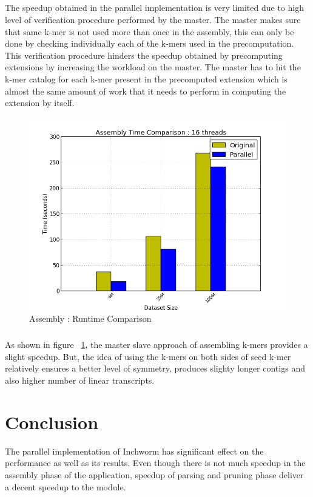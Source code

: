 \label{key}\documentclass[bachinf, english ,zihtitle,final,hyperref,utf8]{zihpub}
\begin{document}
\paragraph{}
The speedup obtained in the parallel implementation is very limited due to high level of verification procedure performed by the master. The master makes sure that same k-mer is not used more than once in the assembly, this can only be done by checking individually each of the k-mers used in the precomputation. This verification procedure hinders the speedup obtained by precomputing extensions by increasing the workload on the master. The master has to hit the k-mer catalog for each k-mer present in the precomputed extension which is almost the same amount of work that it needs to perform in computing the extension by 
itself.
\begin{figure}[h]
\center
\includegraphics[scale=0.45]{compare-assembly}
\caption{Assembly : Runtime Comparison}
\label{assembly-compare}
\end{figure}
\paragraph{}
As shown in figure ~\ref{assembly-compare}, the master slave approach of assembling k-mers provides a slight speedup. But, the idea of using the k-mers on both sides of seed k-mer relatively ensures a better level of symmetry, produces slighty longer contigs and also higher number of linear transcripts.
\newpage
\newpage
\chapter{Conclusion}
The parallel implementation of Inchworm has significant effect on the performance as well as its results. Even though there is not much speedup in the assembly phase of the application, speedup of parsing and pruning phase deliver a decent speedup to the module.
\end{document}
